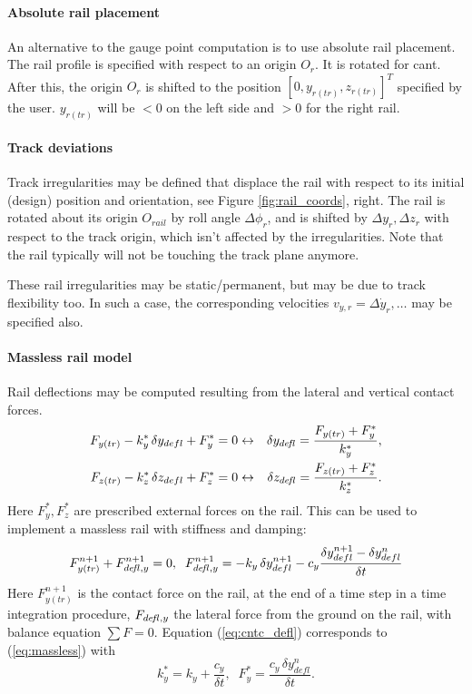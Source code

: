 \documentclass[12pt]{report}
\begin{document}
\paragraph{Absolute rail placement}

An alternative to the gauge point computation is to use absolute rail
placement. The rail profile is specified with respect to an origin $O_r$.
It is rotated for cant. After this, the origin $O_r$ is shifted to the
position $[0,y_{r(tr)},z_{r(tr)}]^T$ specified by the user. $y_{r(tr)}$
will be $<0$ on the left side and $>0$ for the right rail.

\paragraph{Track deviations}

Track irregularities may be defined that displace the rail with respect to
its initial (design) position and orientation, see Figure
\ref{fig:rail_coords}, right. The rail is rotated about its origin
$O_{rail}$ by roll angle $\Delta\phi_{r}$, and is shifted by $\Delta
y_{r},\Delta z_{r}$ with respect to the track origin, which isn't
affected by the irregularities. Note that the rail typically will not be
touching the track plane anymore.

These rail irregularities may be static/permanent, but may be due to track
flexibility too. In such a case, the corresponding velocities
$v_{y,r}=\Delta\dot{y}_{r}, \ldots$ may be specified also.

\paragraph{Massless rail model}

Rail deflections may be computed resulting from the lateral and
vertical contact forces.
\begin{eqnarray}\label{eq:cntc_defl}
   F_{y(tr)} - k^*_y\,\delta y_{defl} + F^*_y = 0 &\leftrightarrow&
   \delta y_{de\!f\mkern-2mul} = \frac{F_{y(tr)} + F^*_y}{ k^*_y } , \\
   F_{z(tr)} - k^*_z\,\delta z_{defl} + F^*_z = 0 &\leftrightarrow&
   \delta z_{de\!f\mkern-2mul} = \frac{F_{z(tr)} + F^*_z}{ k^*_z } .
\end{eqnarray}
Here $F_y^*, F_z^*$ are prescribed external forces on the rail.
This can be used to implement a massless rail with stiffness and damping:
\begin{equation}\label{eq:massless}
   F_{y(tr)}^{n+1} + F^{n+1}_{de\!f\mkern-2mul,y} = 0, \;\;
   F^{n+1}_{de\!f\mkern-2mul,y} = -k_y\,\delta y^{n+1}_{defl} - c_y \frac{\delta
        y^{n+1}_{defl} - \delta y^n_{defl}}{ \delta t }
\end{equation}
Here $F_{y(tr)}^{n+1}$ is the contact force on the rail, at the end of a
time step in a time integration procedure, $F_{de\!f\mkern-2mul,y}$ the lateral force
from the ground on the rail, with balance equation $\sum F=0$.
Equation (\ref{eq:cntc_defl}) corresponds to (\ref{eq:massless}) with
\begin{equation}
   k^*_y = k_y + \frac{c_y}{\delta t}, \;\; 
   F^*_y = \frac{ c_y\,\delta y_{defl}^n}{\delta t} .
\end{equation}
\end{document}
